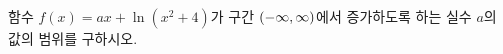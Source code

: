 함수 $f(x)=ax+\ln(x^2+4)$가 구간 $(-\infty{,}\mkern3mu\mathopen{}\infty)$에서 증가하도록 하는 실수 $a$의 값의 범위를 구하시오.
